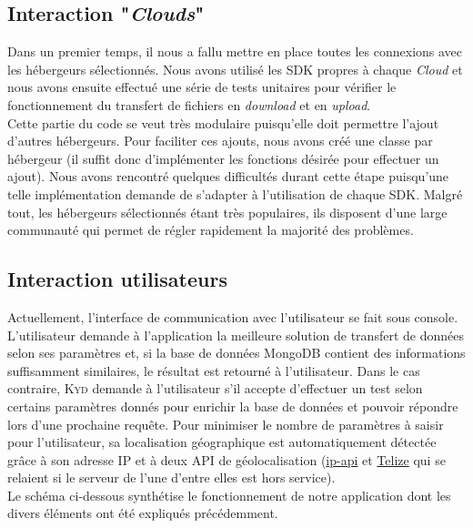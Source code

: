 \documentclass[10pt]{article}
\newcommand{\KYD}{\textsc{Kyd}\xspace}
\begin{document}
\subsection{Interaction "\textit{Clouds}"}

Dans un premier temps, il nous a fallu mettre en place toutes les
connexions avec les hébergeurs sélectionnés. Nous avons utilisé les
SDK propres à chaque \textit{Cloud} et nous avons ensuite effectué une série
de tests unitaires pour vérifier le fonctionnement du transfert de
fichiers en \textit{download} et en \textit{upload}.\\

Cette partie du code se veut très modulaire puisqu'elle doit permettre l'ajout
d'autres hébergeurs. Pour faciliter ces ajouts, nous avons créé une classe par
hébergeur (il suffit donc d'implémenter les fonctions désirée pour effectuer un
ajout). Nous avons rencontré quelques difficultés durant cette étape puisqu'une
telle implémentation demande de s'adapter à l'utilisation de chaque SDK. Malgré
tout, les hébergeurs sélectionnés étant très populaires, ils disposent d'une
large communauté qui permet de régler rapidement la majorité des problèmes.

\subsection{Interaction utilisateurs}

Actuellement, l'interface de communication avec l'utilisateur se fait
sous console. L'utilisateur demande à l'application la meilleure
solution de transfert de données selon ses paramètres et, si la base
de données MongoDB contient des informations suffisamment similaires,
le résultat est retourné à l'utilisateur. Dans le cas contraire, \KYD
demande à l'utilisateur s'il accepte d'effectuer un test selon
certains paramètres donnés pour enrichir la base de données et pouvoir
répondre lors d'une prochaine requête. Pour minimiser le nombre de
paramètres à saisir pour l'utilisateur, sa localisation géographique
est automatiquement détectée grâce à son adresse IP et à deux API de
géolocalisation (\href{http://ip-api.com/docs/api:json}{ip-api} et
\href{http://www.telize.com/}{Telize} qui se relaient si le serveur de l'une
d'entre elles est hors service).\\

Le schéma ci-dessous synthétise le fonctionnement de notre application
dont les divers éléments ont été expliqués précédemment.
\newpage
\end{document}
